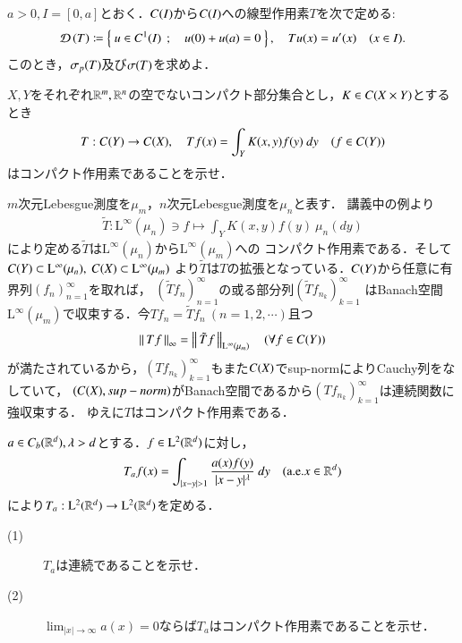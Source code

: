 	
	\begin{screen}
		[4]$a > 0,I = [0,a]$とおく．$C(I)$から$C(I)$への線型作用素$T$を次で定める:
			\begin{align}
				\Dom{T} \coloneqq \Set{u \in \cn{I}{1}}{u(0) + u(a) = 0},
				\quad Tu(x) = u'(x) \quad (x \in I).
			\end{align}
			このとき，$\mathfrak{\sigma}_p (T) $及び$\mathfrak{\sigma} (T) $を求めよ．
	\end{screen}
	
	
	
	\begin{screen}
		[5] $X,Y$をそれぞれ$\mathbb{R}^m,\mathbb{R}^n$の空でないコンパクト部分集合とし，$K \in C(X \times Y)$とするとき
		\begin{align}
			T:C(Y) \rightarrow C(X),
			\quad T f(x) = \int_Y K(x,y) f(y)\ dy \quad (f \in C(Y))
		\end{align}
		はコンパクト作用素であることを示せ．
	\end{screen}
	
	\begin{prf}
		$m$次元Lebesgue測度を$\mu_m$，$n$次元Lebesgue測度を$\mu_n$と表す．
		講義中の例より
		\begin{align}
			\tilde{T}:\mathrm{L}^\infty(\mu_n) \ni f \longmapsto \int_Y K(x,y) f(y)\ \mu_n(dy)
		\end{align}
		により定める$\tilde{T}$は$\mathrm{L}^\infty(\mu_n)$から$\mathrm{L}^\infty(\mu_m)$への
		コンパクト作用素である．そして$C(Y) \subset \mathrm{L}^\infty(\mu_n),\ C(X) \subset \mathrm{L}^\infty(\mu_m)$
		より$\tilde{T}$は$T$の拡張となっている．$C(Y)$から任意に有界列$(f_n)_{n=1}^{\infty}$を取れば，
		$\left( \tilde{T} f_n \right)_{n=1}^{\infty}$の或る部分列$\left( \tilde{T} f_{n_k} \right)_{k=1}^{\infty}$
		はBanach空間$\mathrm{L}^\infty(\mu_m)$で収束する．今$T f_n = \tilde{T} f_n\ (n=1,2,\cdots)$且つ
		\begin{align}
			\left\|\, T f\, \right\|_{\infty} = \left\|\, \tilde{T}f\, \right\|_{\mathrm{L}^\infty(\mu_m)} \quad (\forall f \in C(Y))
		\end{align}
		が満たされているから，$\left( T f_{n_k} \right)_{k=1}^{\infty}$もまた$C(X)$でsup-normによりCauchy列をなしていて，
		$(C(X),sup-norm)$がBanach空間であるから$\left( T f_{n_k} \right)_{k=1}^{\infty}$は連続関数に強収束する．
		ゆえに$T$はコンパクト作用素である．
		\QED
	\end{prf}
	
	\begin{screen}
		[6] $a \in C_b (\mathbb{R}^d), \lambda > d$とする．$f \in \mathrm{L}^2(\mathbb{R}^d)$に対し，
		\begin{align}
			T_a f(x) = \int_{|x - y| > 1} \frac{a(x)f(y)}{|x-y|^\lambda}\ dy
			\quad (\mbox{a.e.}x \in \mathbb{R}^d)
		\end{align}
		により$T_a:\mathrm{L}^2(\mathbb{R}^d) \rightarrow \mathrm{L}^2(\mathbb{R}^d)$を定める．
		\begin{description}
			\item[(1)] $T_a$は連続であることを示せ．
			\item[(2)] $\lim_{|x| \to \infty} a(x) = 0$ならば$T_a$はコンパクト作用素であることを示せ．
		\end{description}
	\end{screen}
	
